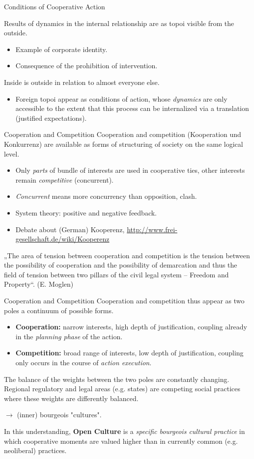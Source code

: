 \documentclass{beamer}
\begin{document}
\begin{frame}{Conditions of Cooperative Action}
  
Results of dynamics in the internal relationship are as topoi visible from the
outside.
\begin{itemize}
\item Example of corporate identity.
\item Consequence of the prohibition of intervention.
\end{itemize}
Inside is outside in relation to almost everyone else.
\begin{itemize}
\item Foreign topoi appear as conditions of action, whose \emph{dynamics} are
  only accessible to the extent that this process can be internalized via a
  translation (justified expectations).
\end{itemize}
\end{frame}

\begin{frame}{Cooperation and Competition}
Cooperation and competition (Kooperation und Konkurrenz) are available as
forms of structuring of society on the same logical level.
\begin{itemize}
\item Only \emph{parts} of bundle of interests are used in cooperative ties,
  other interests remain \emph{competitive} (concurrent).
\item \emph{Concurrent} means more concurrency than opposition, clash.
\item System theory: positive and negative feedback.
\item Debate about (German) Kooperenz,
  \url{http://www.frei-gesellschaft.de/wiki/Kooperenz}
\end{itemize}
„The area of tension between cooperation and competition is the tension
between the possibility of cooperation and the possibility of demarcation and
thus the field of tension between two pillars of the civil legal system --
Freedom and Property“. (E. Moglen)
\end{frame}

\begin{frame}{Cooperation and Competition}
Cooperation and competition thus appear as two poles a continuum of possible
forms.
\begin{itemize}
\item \textbf{Cooperation:} narrow interests, high depth of justification,
  coupling already in the \emph{planning phase} of the action.
\item \textbf{Competition:} broad range of interests, low depth of
  justification, coupling only occurs in the course of \emph{action
    execution}.
\end{itemize}
The balance of the weights between the two poles are constantly changing.
Regional regulatory and legal areas (e.g. states) are competing social
practices where these weights are differently balanced.

$\to$ (inner) bourgeois "cultures".

In this understanding, \textbf{Open Culture} is a \emph{specific bourgeois
  cultural practice} in which cooperative moments are valued higher than in
currently common (e.g. neoliberal) practices.
\end{frame}
\end{document}
